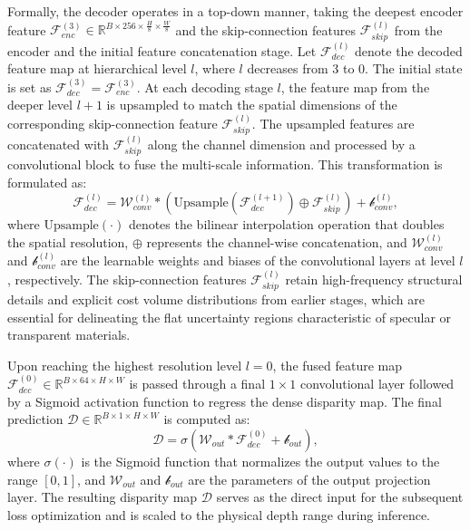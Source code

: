 \documentclass[lettersize,journal]{IEEEtran}
\begin{document}
Formally, the decoder operates in a top-down manner, taking the deepest encoder feature $\mathcal{F}_{enc}^{(3)} \in \mathbb{R}^{B \times 256 \times \frac{H}{8} \times \frac{W}{8}}$ and the skip-connection features $\mathcal{F}_{skip}^{(l)}$ from the encoder and the initial feature concatenation stage. Let $\mathcal{F}_{dec}^{(l)}$ denote the decoded feature map at hierarchical level $l$, where $l$ decreases from 3 to 0. The initial state is set as $\mathcal{F}_{dec}^{(3)} = \mathcal{F}_{enc}^{(3)}$. At each decoding stage $l$, the feature map from the deeper level $l+1$ is upsampled to match the spatial dimensions of the corresponding skip-connection feature $\mathcal{F}_{skip}^{(l)}$. The upsampled features are concatenated with $\mathcal{F}_{skip}^{(l)}$ along the channel dimension and processed by a convolutional block to fuse the multi-scale information. This transformation is formulated as:
\begin{equation}
\mathcal{F}_{dec}^{(l)} = \mathcal{W}_{conv}^{(l)} * \left( \text{Upsample}(\mathcal{F}_{dec}^{(l+1)}) \oplus \mathcal{F}_{skip}^{(l)} \right) + \mathcal{b}_{conv}^{(l)},
\end{equation}
where $\text{Upsample}(\cdot)$ denotes the bilinear interpolation operation that doubles the spatial resolution, $\oplus$ represents the channel-wise concatenation, and $\mathcal{W}_{conv}^{(l)}$ and $\mathcal{b}_{conv}^{(l)}$ are the learnable weights and biases of the convolutional layers at level $l$, respectively. The skip-connection features $\mathcal{F}_{skip}^{(l)}$ retain high-frequency structural details and explicit cost volume distributions from earlier stages, which are essential for delineating the flat uncertainty regions characteristic of specular or transparent materials.

Upon reaching the highest resolution level $l=0$, the fused feature map $\mathcal{F}_{dec}^{(0)} \in \mathbb{R}^{B \times 64 \times H \times W}$ is passed through a final $1 \times 1$ convolutional layer followed by a Sigmoid activation function to regress the dense disparity map. The final prediction $\mathcal{D} \in \mathbb{R}^{B \times 1 \times H \times W}$ is computed as:
\begin{equation}
\mathcal{D} = \sigma \left( \mathcal{W}_{out} * \mathcal{F}_{dec}^{(0)} + \mathcal{b}_{out} \right),
\end{equation}
where $\sigma(\cdot)$ is the Sigmoid function that normalizes the output values to the range $[0, 1]$, and $\mathcal{W}_{out}$ and $\mathcal{b}_{out}$ are the parameters of the output projection layer. The resulting disparity map $\mathcal{D}$ serves as the direct input for the subsequent loss optimization and is scaled to the physical depth range during inference.
\end{document}
